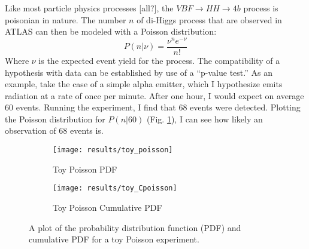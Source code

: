     Like most particle physics processes [all?], the $VBF \to HH \to 4b$ process is poisonian in nature.
    The number $n$ of di-Higgs process that are observed in ATLAS can then be modeled with a Poisson distribution\cite{cranmer2015practical}:
    \begin{equation}
        P(n|\nu) = \frac{ \nu^n e^{-\nu} }{n!}
    \end{equation}
    Where $\nu$ is the expected event yield for the process.
    The compatibility of a hypothesis with data can be established by use of a ``p-value test.''
    As an example, take the case of a simple alpha emitter,
        which I hypothesize emits radiation at a rate of once per minute.
    After one hour, I would expect on average 60 events.
    Running the experiment, I find that 68 events were detected.
    Plotting the Poisson distribution for $P(n|60)$ (Fig. \ref{fig:poisson_toy_sig:pdf}),
        I can see how likely an observation of 68 events is.
    \begin{figure}
        \centering
        \begin{subfigure}{0.48\textwidth} 
            \texttt{[image: results/toy\_poisson]}
            \caption{Toy Poisson PDF}
            \label{fig:poisson_toy_sig:pdf}
        \end{subfigure}
        \begin{subfigure}{0.48\textwidth}
            \texttt{[image: results/toy\_Cpoisson]}
            \caption{Toy Poisson Cumulative PDF}
            \label{fig:poisson_toy_sig:Cpdf}
        \end{subfigure}
        \caption{
            A plot of the probability distribution function (PDF)
                and cumulative PDF for a toy Poisson experiment.
        }
    \end{figure}

